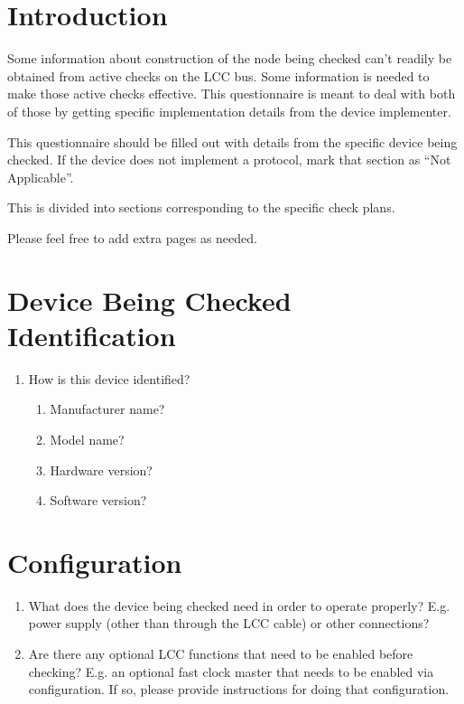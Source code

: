 



\maketitle
\thispagestyle{firststyle}

\section{Introduction}

Some information about construction of the node being checked can't readily be obtained
from active checks on the LCC bus. Some information is needed to make those active 
checks effective.  This questionnaire is meant to deal with both of those
by getting specific implementation details from the device implementer.

This questionnaire should be filled out with details from the specific device being checked.
If the device does not implement a protocol, mark that section as ``Not Applicable''.

This is divided into sections corresponding to the specific check plans.

Please feel free to add extra pages as needed.

\section{Device Being Checked Identification}
    \begin{enumerate}
    \item How is this device identified?
        \begin{enumerate}
        \item Manufacturer name?
        \item Model name?
        \item Hardware version?
        \item Software version?
        \end{enumerate}
    \end{enumerate}

\section{Configuration}
    \begin{enumerate}
    \item What does the device being checked need in order to operate properly?
            E.g. power supply (other than through the LCC cable) or other connections?
    \item Are there any optional LCC functions that need to be enabled before checking?
            E.g. an optional fast clock master that needs to be enabled via configuration.
            If so, please provide instructions for doing that configuration.
    \end{enumerate}
    
